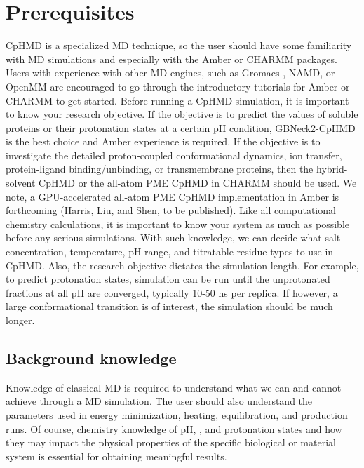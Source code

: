\section{Prerequisites} %
CpHMD is a specialized MD technique, so the user should have some familiarity with MD simulations and especially with the Amber or CHARMM packages. 
Users with experience with other MD engines, such as Gromacs
\cite{Abraham_Lindahl_2015_SoftwareX}, NAMD\cite{Phillips_Tajkhorshid_2020_J.Chem.Phys.}, 
or OpenMM
\cite{Eastman_Pande_2017_PLoSComput.Biol.} 
are encouraged to go through the introductory tutorials for Amber or CHARMM to get started. 
Before running a CpHMD simulation, it is important to know your research objective. 
If the objective is to predict the {\pka} values of soluble proteins or their protonation states at a certain pH condition, GBNeck2-CpHMD 
\cite{Huang_Shen_2018_J.Chem.Inf.Model.,Harris_Shen_2019_J.Chem.Inf.Model.}
is the best choice and Amber \cite{Case_Kollman_2018_}
experience is required. 
If the objective is to investigate the detailed proton-coupled conformational dynamics, ion transfer, protein-ligand binding/unbinding,
or transmembrane proteins, then 
the hybrid-solvent CpHMD  \cite{Wallace_Shen_2011_J.Chem.TheoryComput.,Huang_Shen_2016_Nat.Commun.} 
or the all-atom PME CpHMD \cite{Huang_Shen_2016_J.Chem.TheoryComput.}
in CHARMM
\cite{Brooks_Karplus_2009_J.Comput.Chem.}
should be used.
We note, a GPU-accelerated all-atom PME CpHMD 
implementation in Amber is forthcoming (Harris, Liu, and Shen, to be published). 
Like all computational chemistry calculations, it is important to know your system as much as possible before any serious simulations. 
With such knowledge, we can decide what salt concentration, temperature, pH range, and titratable residue types to use in CpHMD. Also, the research objective dictates the simulation length. For example, to predict protonation states, simulation can be run until the unprotonated fractions at all pH are converged, typically 10-50 ns per replica. If however, a large conformational transition is of interest, the simulation should be much longer. 

\subsection{Background knowledge}
Knowledge of classical MD is required to understand what we can and cannot achieve through a MD simulation. 
The user should also understand the parameters used in energy minimization, heating, equilibration, and production runs. 
Of course, chemistry knowledge of pH, {\pka}, and protonation states and how they may impact the physical properties of the specific biological or material system is essential for obtaining meaningful results.

